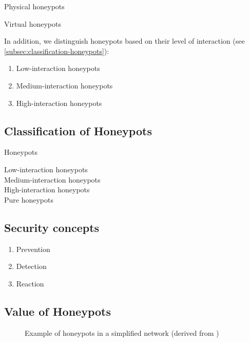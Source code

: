 Physical honeypots

Virtual honeypots

In addition, we distinguish honeypots based on their level of interaction (see \autoref{subsec:classification-honeypots}):

\begin{enumerate}
    \item Low-interaction honeypots
    \item Medium-interaction honeypots
    \item High-interaction honeypots
\end{enumerate}

\subsection{Classification of Honeypots}
\label{subsec:classification-honeypots}

Honeypots 

Low-interaction honeypots\\

Medium-interaction honeypots\\

High-interaction honeypots\\

Pure honeypots\\

\subsection{Security concepts}
\label{subsec:honeypot-security-concept}


\begin{enumerate}
    \item Prevention
    \item Detection
    \item Reaction
\end{enumerate}

\cite{NawrockiWSKS2016}

\subsection{Value of Honeypots}

\begin{figure}[h]
    \centering
    
    \caption{Example of honeypots in a simplified network (derived from \cite{Spitzner2003})}
    \label{fig:honeypot-example}
\end{figure}

